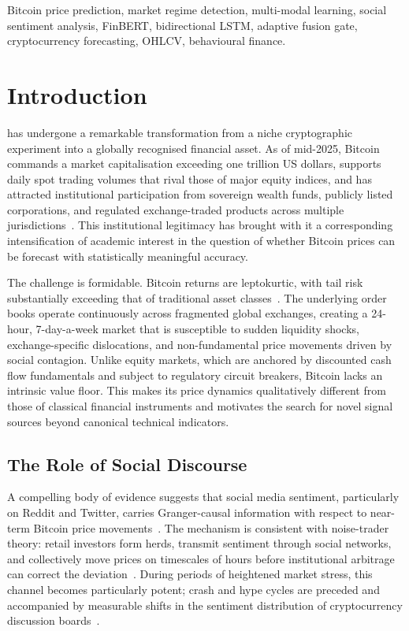\documentclass[journal]{IEEEtran}
\begin{document}
\begin{IEEEkeywords}
Bitcoin price prediction, market regime detection, multi-modal learning, social
sentiment analysis, FinBERT, bidirectional LSTM, adaptive fusion gate,
cryptocurrency forecasting, OHLCV, behavioural finance.
\end{IEEEkeywords}

\section{Introduction}
\label{sec:intro}

 has undergone a remarkable transformation from a
niche cryptographic experiment into a globally recognised financial asset.
As of mid-2025, Bitcoin commands a market capitalisation exceeding one trillion
US dollars, supports daily spot trading volumes that rival those of major equity
indices, and has attracted institutional participation from sovereign wealth
funds, publicly listed corporations, and regulated exchange-traded products
across multiple jurisdictions~\cite{coinmarketcap2025}. This institutional
legitimacy has brought with it a corresponding intensification of academic
interest in the question of whether Bitcoin prices can be forecast with
statistically meaningful accuracy.

The challenge is formidable. Bitcoin returns are leptokurtic, with tail risk
substantially exceeding that of traditional asset classes~\cite{baur2018bitcoin}.
The underlying order books operate continuously across fragmented global
exchanges, creating a 24-hour, 7-day-a-week market that is susceptible to
sudden liquidity shocks, exchange-specific dislocations, and non-fundamental
price movements driven by social contagion. Unlike equity markets, which are
anchored by discounted cash flow fundamentals and subject to regulatory circuit
breakers, Bitcoin lacks an intrinsic value floor. This makes its price dynamics
qualitatively different from those of classical financial instruments and
motivates the search for novel signal sources beyond canonical technical
indicators.

\subsection{The Role of Social Discourse}
A compelling body of evidence suggests that social media sentiment, particularly
on Reddit and Twitter, carries Granger-causal information with respect to
near-term Bitcoin price movements~\cite{bollen2011twitter, Abraham2018,
Shen2019reddit}. The mechanism is consistent with noise-trader theory: retail
investors form herds, transmit sentiment through social networks, and collectively
move prices on timescales of hours before institutional arbitrage can correct the
deviation~\cite{delong1990noise}. During periods of heightened market stress,
this channel becomes particularly potent; crash and hype cycles are preceded and
accompanied by measurable shifts in the sentiment distribution of cryptocurrency
discussion boards~\cite{philippas2019media}.
\end{document}
